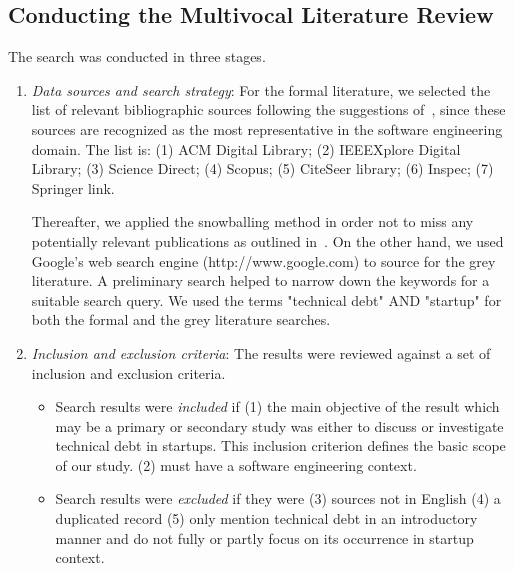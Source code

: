 \subsection*{Conducting the Multivocal Literature Review}
The search was conducted in three stages.
\begin{enumerate}
\item \emph{Data sources and search strategy}: For the formal literature, we selected the list of relevant bibliographic sources following the suggestions of~\cite{kitchenham2007guidelines}, since these sources are
recognized as the most representative in the software engineering domain.
The list is: (1) ACM Digital Library;  (2) IEEEXplore Digital Library; (3) Science Direct; (4) Scopus; (5) CiteSeer library; (6) Inspec; (7) Springer link.

Thereafter, we applied the snowballing method in order not to miss any potentially relevant publications as outlined in~\cite{Wohlin2014/2601248.2601268}.
On the other hand, we used Google's web search engine (http://www.google.com) to source for the grey literature.
A preliminary search helped to narrow down the keywords for a suitable search query.
We used the terms "technical debt" AND "startup" for both the formal and the grey literature searches.

\item \emph{Inclusion and exclusion criteria}: The results were reviewed against a set of inclusion and exclusion criteria.

\begin{itemize}
\item Search results were \emph{included} if 
(1) the main objective of the result which may be a primary or secondary  study was either to discuss or investigate technical debt in startups.
This inclusion criterion defines the basic scope of our study.
(2) must have a software engineering context.

\item Search results were \emph{excluded} if they were 
(3) sources not in English
(4) a duplicated record 
(5) only mention technical debt in an introductory manner and do not fully or partly focus on its occurrence in startup context.
\end{itemize}


\end{enumerate}
